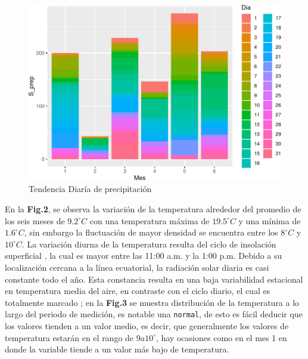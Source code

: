 \documentclass[conference,final,]{IEEEtran}
\makeatletter
\def\maxwidth{\ifdim\Gin@nat@width>\linewidth\linewidth
\else\Gin@nat@width\fi}
\let\Oldincludegraphics\includegraphics
\renewcommand{\includegraphics}[1]{\Oldincludegraphics[width=\maxwidth]{#1}}
\makeatother
\begin{document}
\begin{figure}
\centering
\includegraphics{Hidrology_files/figure-latex/unnamed-chunk-1-1.pdf}
\caption{Tendencia Diaría de precipitación}
\end{figure}

En la \textbf{Fig.2}, se observa la variación de la temperatura
alrededor del promedio de los seis meses de \(9.2^{\circ}C\) con una
temperatura máxima de \(19.5^{\circ}C\) y una mínima de
\(1.6^{\circ}C\), sin embargo la fluctuación de mayor densidad se
encuentra entre los \(8^{\circ}C\) y \(10^{\circ}C\). La variación
diurna de la temperatura resulta del ciclo de insolación superficial
\cite{poveda2004hidroclimatologia}, la cual es mayor entre las 11:00
a.m. y la 1:00 p.m. Debido a su localización cercana a la línea
ecuatorial, la radiación solar diaria es casi constante todo el año.
Esta constancia resulta en una baja variabilidad estacional en
temperatura media del aire, en contraste con el ciclo diario, el cual es
totalmente marcado \cite{buytaert2006hidrologia}; en la \textbf{Fig.3}
se muestra distribución de la temperatura a lo largo del periodo de
medición, es notable una \texttt{normal}, de esto es fácil deducir que
los valores tienden a un valor medio, es decir, que generalmente los
valores de temperatura estarán en el rango de \(9 a 10^{\circ}\), hay
ocasiones como en el mes 1 en donde la variable tiende a un valor más
bajo de temperatura.
\end{document}
